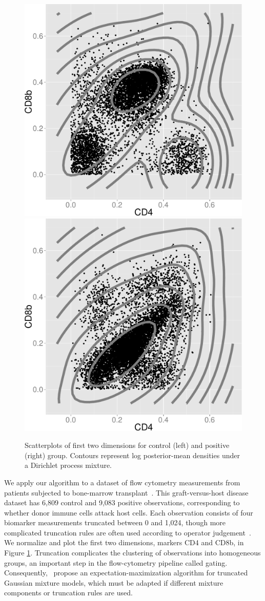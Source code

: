 



  \begin{figure}
  \centering
    \includegraphics[width=.27\textwidth]{figs/gvhd_control.pdf}
    \includegraphics[width=.27\textwidth]{figs/gvhd_pos.pdf}
\caption{ Scatterplots of first two dimensions for control (left) and positive (right) group. Contours represent
log posterior-mean densities under a Dirichlet process mixture.}
  \label{fig:plot_gvhd}
  \end{figure}

We apply our algorithm to a dataset of flow cytometry measurements from patients subjected to bone-marrow transplant~\citep{Brink07}. This graft-versus-host disease
dataset has 6,809 control and 9,083 positive observations, corresponding to whether donor immune cells attack host cells.
Each observation consists of four biomarker measurements truncated between 0 and 1,024, though more complicated truncation rules are often 
used according to operator judgement~\citep{Lee2012}. We normalize and plot the first two dimensions, markers CD4 and CD8b, in 
Figure \ref{fig:plot_gvhd}.
Truncation complicates the clustering of observations into homogeneous groups, an important step in the flow-cytometry pipeline called
gating.
Consequently,~\cite{Lee2012} propose an expectation-maximization algorithm for truncated Gaussian mixture models, which must be adapted if
different mixture components or truncation rules are used. 

